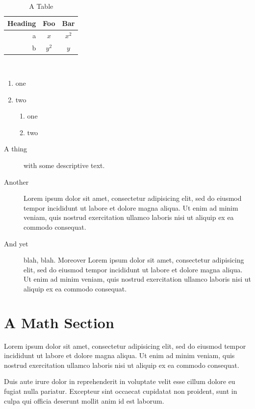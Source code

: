 \documentclass{amsart}
\theoremstyle{definition}
\theoremstyle{remark}
\numberwithin{equation}{section}
\begin{document}
\begin{table}
\begin{centering}
\begin{tabular}{r|cc}
Heading & Foo & Bar\\\hline
a & $x$ & $x^2$\\
b & $y^2$ & $y$\\
\end{tabular}\\
\end{centering}
\caption{A Table}
\end{table}

\begin{enumerate}
 \item one
 \item two
   \begin{enumerate}
    \item one
    \item two
   \end{enumerate}
\end{enumerate}

\begin{description}
\item[A thing] with some descriptive text.
\item[Another] Lorem ipsum dolor sit amet, consectetur adipisicing elit, sed do eiusmod tempor incididunt ut labore et dolore magna aliqua. Ut enim ad minim veniam, quis nostrud exercitation ullamco laboris nisi ut aliquip ex ea commodo consequat. 
\item[And yet] blah, blah. Moreover
Lorem ipsum dolor sit amet, consectetur adipisicing elit, sed do eiusmod tempor incididunt ut labore et dolore magna aliqua. Ut enim ad minim veniam, quis nostrud exercitation ullamco laboris nisi ut aliquip ex ea commodo consequat. 
\end{description}

\section{A Math Section}
Lorem ipsum dolor sit amet, consectetur adipisicing elit, sed do eiusmod tempor incididunt ut labore et dolore magna aliqua. Ut enim ad minim veniam, quis nostrud exercitation ullamco laboris nisi ut aliquip ex ea commodo consequat.

 Duis aute irure dolor in reprehenderit in voluptate velit esse cillum dolore eu fugiat nulla pariatur. Excepteur sint occaecat cupidatat non proident, sunt in culpa qui officia deserunt mollit anim id est laborum.
\end{document}
